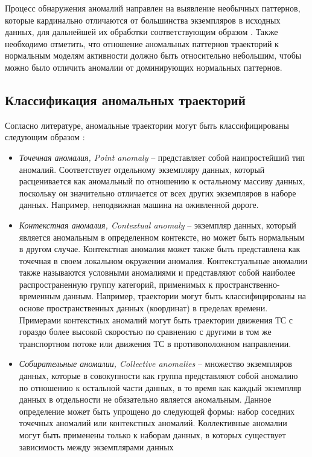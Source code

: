 Процесс обнаружения аномалий направлен на выявление необычных паттернов, которые кардинально отличаются от большинства экземпляров в исходных данных, для дальнейшей их обработки соответствующим образом \cite{article:11_eod_hdd}. Также необходимо отметить, что отношение аномальных паттернов траекторий к нормальным моделям активности должно быть относительно небольшим, чтобы можно было отличить аномалии от доминирующих нормальных паттернов.

\subsection{Классификация аномальных траекторий}

Согласно литературе, аномальные траектории могут быть классифицированы следующим образом \cite{article:15_survey_ad}\cite{article:6_survey_anom_det_rtuvs}\cite{article:comp_analys_odt}:
\begin{itemize}
	\setlength\itemsep{-0.5em}
	\item \textit{Точечная аномалия, Point anomaly} -- представляет собой наипростейший тип аномалий. Соответствует отдельному экземпляру данных, который расценивается как аномальный по отношению к остальному массиву данных, поскольку он значительно отличается от всех других экземпляров в наборе данных. Например, неподвижная машина на оживленной дороге.
	\item \textit{Контекстная аномалия, Contextual anomaly} -- экземпляр данных, который является аномальным в определенном контексте, но может быть нормальным в другом случае. Контекстная аномалия может также быть представлена как точечная в своем локальном окружении аномалия. Контекстуальные аномалии также называются условными аномалиями и представляют собой наиболее распространенную группу категорий, применимых к пространственно-временным данным. Например, траектории могут быть классифицированы на основе пространственных данных (координат) в пределах времени. Примерами контекстных аномалий могут быть траектории движения ТС с гораздо более высокой скоростью по сравнению с другими в том же транспортном потоке или движения ТС в противоположном направлении.
	\item \textit{Собирательные аномалии, Collective anomalies} -- множество экземпляров данных, которые в совокупности как группа представляют собой аномалию по отношению к остальной части данных, в то время как каждый экземпляр данных в отдельности не обязательно является аномальным. Данное определение может быть упрощено до следующей формы: набор соседних точечных аномалий или контекстных аномалий. Коллективные аномалии могут быть применены только к наборам данных, в которых существует зависимость между экземплярами данных
\end{itemize}

